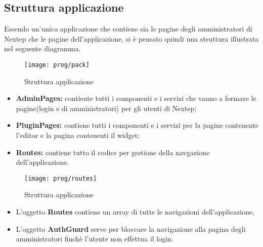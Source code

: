 \subsection{Struttura applicazione}
Essendo un'unica applicazione che contiene sia le pagine degli amministratori di Nextep che le pagine dell'applicazione, si è pensato quindi una struttura illustrata nel seguente diagramma.
\begin{figure}[!h] 
	\centering 
	\texttt{[image: prog/pack]} 
	\caption{Struttura applicazione}
\end{figure}
\begin{itemize}
	\item \textbf{AdminPages:} contiente tutti i componenti e i servizi che vanno a formare le pagine(login e di amministratori) per gli utenti di Nextep;
	\item \textbf{PluginPages:} contiene tutti i componenti e i servizi per la pagine contenente l'editor e la pagina contenenti il widget;
	\item \textbf{Routes:} contiene tutto il codice per gestione della navgazione dell'applicazione.
\end{itemize}
\begin{figure}[!h] 
	\centering 
	\texttt{[image: prog/routes]} 
	\caption{Struttura applicazione}
\end{figure}
\begin{itemize}
	\item L'oggetto \textbf{Routes} contiene un array di tutte le navigazioni dell'applicazione,
	\item L'oggetto \textbf{AuthGuard} serve per bloccare la navigazione alla pagina degli amministratori finchè l'utente non effettua il login. 
	\\
\end{itemize}
